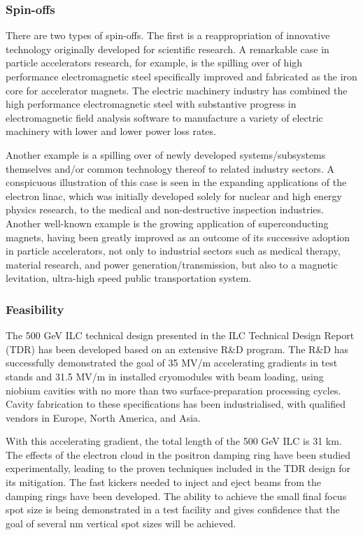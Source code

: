 \subsubsection{Spin-offs}

There are two types of spin-offs. The first is a reappropriation of innovative
technology originally developed for scientific research. A remarkable case in particle
accelerators research, for example, is the spilling over of high performance
electromagnetic steel specifically improved and fabricated as the iron core for accelerator magnets. The electric machinery industry has combined the high performance electromagnetic steel with substantive progress in electromagnetic field analysis software to manufacture a variety of electric machinery with lower and lower power loss rates. 

Another example is a spilling over of newly developed systems/subsystems themselves and/or common technology thereof to related industry sectors. A conspicuous illustration of this case is seen in the expanding applications of the electron linac, which was initially developed solely for nuclear and high energy physics research, to the medical and non-destructive inspection industries. Another well-known example is the growing application of superconducting magnets, having been greatly improved as an outcome of its successive adoption in particle accelerators, not only to industrial sectors such as medical therapy, material research, and power generation/transmission, but also to a magnetic levitation, ultra-high speed public transportation system. \cite{ILC:SpinOffReport}
 
\subsubsection{Feasibility}

The 500 GeV ILC technical design presented in the ILC Technical Design Report (TDR) has been developed based on an extensive R\&D program. The R\&D has
successfully demonstrated the goal of 35 MV/m accelerating gradients in test stands and 31.5 MV/m in installed cryomodules with beam loading, using niobium cavities with no more than two surface-preparation processing cycles. Cavity fabrication to these specifications has been industrialised, with qualified vendors in Europe, North America, and Asia. 

With this accelerating gradient, the total length of the 500 GeV ILC is 31 km. The effects of the electron cloud in the positron damping ring have been studied experimentally, leading to the proven techniques included in the TDR design for its mitigation. The fast kickers needed to inject and eject beams from the damping rings have been developed. The ability to achieve the small final focus spot size is being demonstrated in a test facility and gives confidence that the goal of several nm vertical spot sizes will be achieved. 

